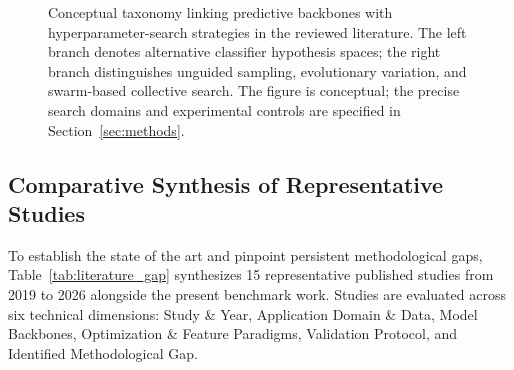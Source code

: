 \begin{figure}[htbp]
%
\caption{Conceptual taxonomy linking predictive backbones with hyperparameter-search strategies in the reviewed literature. The left branch denotes alternative classifier hypothesis spaces; the right branch distinguishes unguided sampling, evolutionary variation, and swarm-based collective search. The figure is conceptual; the precise search domains and experimental controls are specified in Section~\ref{sec:methods}.}
\label{fig:backbone_optimizer_taxonomy}
\end{figure}

\subsection{Comparative Synthesis of Representative Studies}\label{subsec:comparative_synthesis}

To establish the state of the art and pinpoint persistent methodological gaps, Table~\ref{tab:literature_gap} synthesizes 15 representative published studies from 2019 to 2026 alongside the present benchmark work. Studies are evaluated across six technical dimensions: Study \& Year, Application Domain \& Data, Model Backbones, Optimization \& Feature Paradigms, Validation Protocol, and Identified Methodological Gap.

